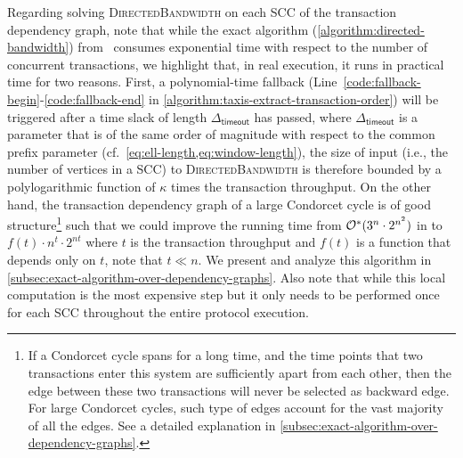 Regarding solving \textsc{DirectedBandwidth} on each SCC of the transaction dependency graph, note that while the exact algorithm (\cref{algorithm:directed-bandwidth}) from~\cite{FSTTCS:JKLSS19} consumes exponential time with respect to the number of concurrent transactions, we highlight that, in real execution, it runs in practical time for two reasons.
%
First, a polynomial-time fallback (Line~\ref{code:fallback-begin}-\ref{code:fallback-end} in \cref{algorithm:taxis-extract-transaction-order}) will be triggered after a time slack of length $\varDelta_{\mathsf{timeout}}$ has passed, where $\varDelta_{\mathsf{timeout}}$ is a parameter that is of the same order of magnitude with respect to the common prefix parameter (cf.~\cref{eq:ell-length,eq:window-length}), the size of input (i.e., the number of vertices in a SCC) to \textsc{DirectedBandwidth} is therefore bounded by a polylogarithmic function of $\kappa$ times the transaction throughput.
%
On the other hand, the transaction dependency graph of a large Condorcet cycle is of good structure\footnote{If a Condorcet cycle spans for a long time, and the time points that two transactions enter this system are sufficiently apart from each other, then the edge between these two transactions will never be selected as backward edge. For large Condorcet cycles, such type of edges account for the vast majority of all the edges. See a detailed explanation in \cref{subsec:exact-algorithm-over-dependency-graphs}.} such that we could improve the running time from $\mathcal{O}^\ast(3^n \cdot 2^{n^2})$ in \cite{FSTTCS:JKLSS19} to $f(t) \cdot n^t \cdot 2^{n t }$ where $t$ is the
transaction throughput and $f(t)$ is a function that depends only on $t$, note that $t \ll n$.
%
We present and analyze this algorithm in \cref{subsec:exact-algorithm-over-dependency-graphs}.
%
Also note that while this local computation is the most expensive step but
it only needs to be performed once for each SCC throughout the entire protocol execution.
